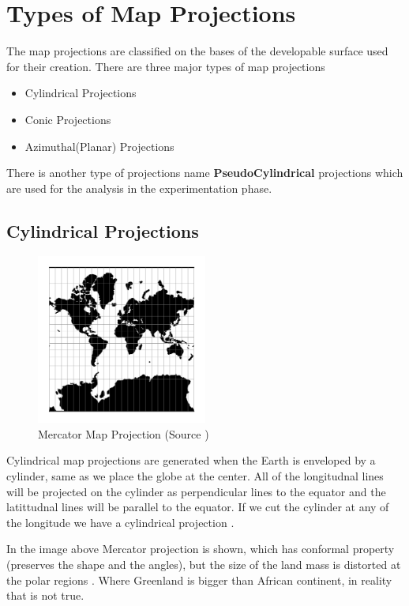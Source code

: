 \section{Types of Map Projections}

The map projections are classified on the bases of the developable surface used for their creation. There are three major types of map projections

\begin{itemize}
    \item Cylindrical Projections
    \item Conic Projections
    \item Azimuthal(Planar) Projections
\end{itemize}

There is another type of projections name \textbf{PseudoCylindrical} projections which are used for the analysis in the experimentation phase.
\subsection{Cylindrical Projections}


\begin{figure}[h]
    \centering
    \includegraphics[width=0.5\textwidth]{figures/chapter-3/merc.png}
    \caption{Mercator Map Projection (Source \cite{PROJ_SITE})}
    \label{fig:mercator-image}
\end{figure}

Cylindrical map projections are generated when the Earth is enveloped by a cylinder, same as we place the globe at the center. All of the longitudnal lines will be projected on the cylinder as perpendicular lines to the equator and the latittudnal lines  will be parallel to the equator. If we cut the cylinder at any of the longitude we have a cylindrical projection \cite{Snyder1982}.

In the image above Mercator projection is shown, which has conformal property (preserves the shape and the angles), but the size of the land mass is distorted at the polar regions \cite{GISGEO_Cylinder}. Where Greenland is bigger than African continent, in reality that is not true.


